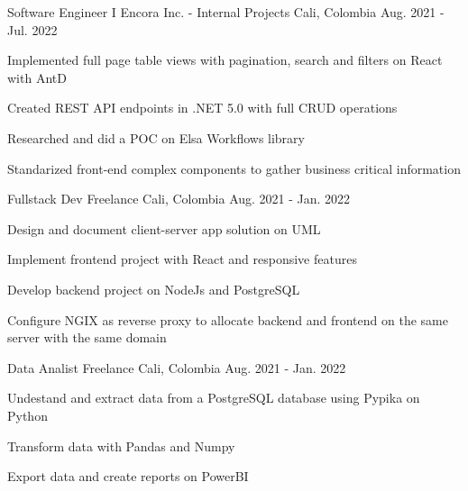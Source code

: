 \begin{cventries}
  \cventry
  {Software Engineer I} %
  {Encora Inc. - Internal Projects} %
  {Cali, Colombia} %
  {Aug. 2021 - Jul. 2022} %
  {
    \begin{cvitems} %
      \item {Implemented full page table views with pagination, search and filters on React with AntD}
      \item {Created REST API endpoints in .NET 5.0 with full CRUD operations}
      \item {Researched and did a POC on Elsa Workflows library}
      \item {Standarized front-end complex components to gather business critical information}
    \end{cvitems}
  }

  \cventry
  {Fullstack Dev} %
  {Freelance} %
  {Cali, Colombia} %
  {Aug. 2021 - Jan. 2022} %
  {
    \begin{cvitems} %
      \item {Design and document client-server app solution on UML}
      \item {Implement frontend project with React and responsive features}
      \item {Develop backend project on NodeJs and PostgreSQL}
      \item {Configure NGIX as reverse proxy to allocate backend and frontend on the same server with the same domain}
    \end{cvitems}
  }

  \cventry
  {Data Analist} %
  {Freelance} %
  {Cali, Colombia} %
  {Aug. 2021 - Jan. 2022} %
  {
    \begin{cvitems} %
      \item {Undestand and extract data from a PostgreSQL database using Pypika on Python}
      \item {Transform data with Pandas and Numpy}
      \item {Export data and create reports on PowerBI}
    \end{cvitems}
  }


\end{cventries}
